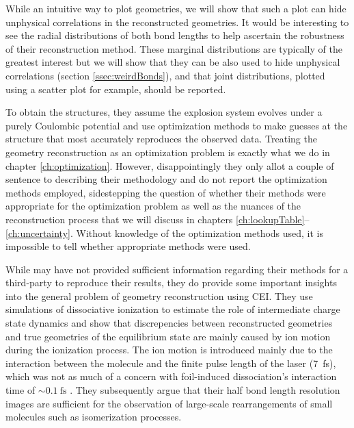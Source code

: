 While an intuitive way to plot geometries, we will show that such a plot can hide unphysical correlations in the reconstructed geometries. It would be interesting to see the radial distributions of both bond lengths to help ascertain the robustness of their reconstruction method. These marginal distributions are typically of the greatest interest but we will show that they can be also used to hide unphysical correlations (section \ref{ssec:weirdBonds}), and that joint distributions, plotted using a scatter plot for example, should be reported.

To obtain the structures, they assume the explosion system evolves under a purely Coulombic potential and use optimization methods to make guesses at the structure that most accurately reproduces the observed data. Treating the geometry reconstruction as an optimization problem is exactly what we do in chapter \ref{ch:optimization}. However, disappointingly they only allot a couple of sentence to describing their methodology and do not report the optimization methods employed, sidestepping the question of whether their methods were appropriate for the optimization problem as well as the nuances of the reconstruction process that we will discuss in chapters \ref{ch:lookupTable}--\ref{ch:uncertainty}. Without knowledge of the optimization methods used, it is impossible to tell whether appropriate methods were used.

While \citet{Legare05structure} may have not provided sufficient information regarding their methods for a third-party to reproduce their results, they do provide some important insights into the general problem of geometry reconstruction using CEI. They use simulations of dissociative ionization to estimate the role of intermediate charge state dynamics and show that discrepencies between reconstructed geometries and true geometries of the equilibrium state are mainly caused by ion motion during the ionization process. The ion motion is introduced mainly due to the interaction between the molecule and the finite pulse length of the laser (\SI{7}{\femto\s}), which was not as much of a concern with foil-induced dissociation's interaction time of $\sim\SI{0.1}{\fs}$ \citep{Vager89}. They subsequently argue that their half bond length resolution images are sufficient for the observation of large-scale rearrangements of small molecules such as isomerization processes.


